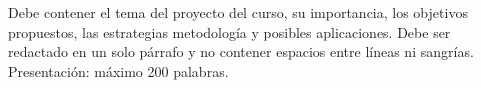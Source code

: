 \begin{resumen}
\noindent
Debe contener el tema del proyecto del curso, su importancia, los objetivos propuestos, las estrategias metodología y posibles aplicaciones. Debe ser redactado en un solo párrafo y no contener espacios entre líneas ni sangrías. Presentación: máximo 200  palabras.

\end{resumen}
